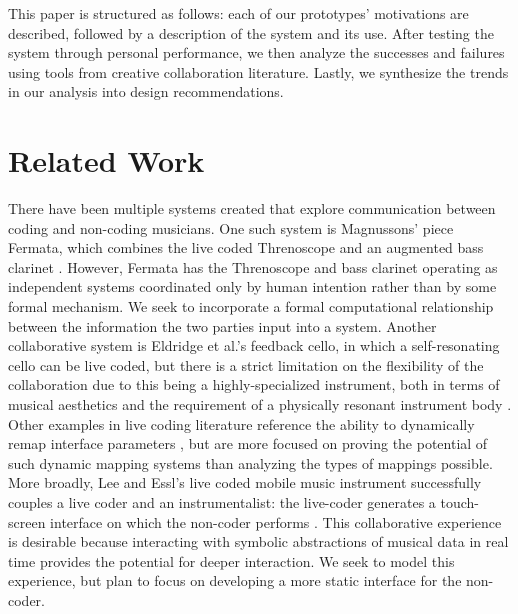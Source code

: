 \documentclass{nime-alternate}
\begin{document}
This paper is structured as follows: each of our prototypes' motivations are described, followed by a description of the system and its use. After testing the system through personal performance, we then analyze the successes and failures using tools from creative collaboration literature. Lastly, we synthesize the trends in our analysis into design recommendations. 

\section{Related Work}
There have been multiple systems created that explore communication between coding and non-coding musicians. One such system is Magnussons' piece Fermata, which combines the live coded Threnoscope and an augmented bass clarinet \cite{furniss_live_2016}. However, Fermata has the Threnoscope and bass clarinet operating as independent systems coordinated only by human intention rather than by some formal mechanism. We seek to incorporate a formal computational relationship between the information the two parties input into a system. Another collaborative system is Eldridge et al.'s feedback cello, in which a self-resonating cello can be live coded, but there is a strict limitation on the flexibility of the collaboration due to this being a highly-specialized instrument, both in terms of musical aesthetics and the requirement of a physically resonant instrument body \cite{eldridge_self-resonating_2017}. Other examples in live coding literature reference the ability to dynamically remap interface parameters \cite{brown_aa-cell_2007,wang_yeah_2005}, but are more focused on proving the potential of such dynamic mapping systems than analyzing the types of mappings possible. More broadly, Lee and Essl's live coded mobile music instrument successfully couples a live coder and an instrumentalist: the live-coder generates a touch-screen interface on which the non-coder performs \cite{lee_live_2013}. This collaborative experience is desirable because interacting with symbolic abstractions of musical data in real time provides the potential for deeper interaction. We seek to model this experience, but plan to focus on developing a more static interface for the non-coder.
\end{document}
